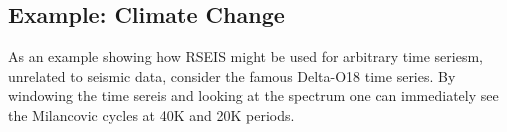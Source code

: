\documentclass{article}
\begin{document}
\subsection{Example: Climate Change}

As an example showing how RSEIS might be used for 
arbitrary time seriesm, unrelated to 
seismic data, consider the famous 
Delta-O18 time series.  By windowing the 
time sereis and looking at the 
spectrum one can immediately see the 
Milancovic cycles at 40K and 20K periods.

\begin{Schunk}
\end{Schunk}
\end{document}
